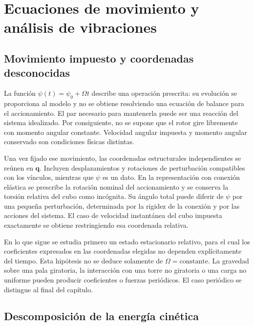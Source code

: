 \documentclass[11pt,a4paper,oneside]{report}
\newcommand{\vct}[1]{\bm{#1}}
\begin{document}
\chapter{Ecuaciones de movimiento y análisis de vibraciones}
\label{ch:operacion}
\section{Movimiento impuesto y coordenadas desconocidas}
La función $\psi(t)=\psi_0+\Omega t$ describe una operación prescrita: su evolución se proporciona al modelo y no se obtiene resolviendo una ecuación de balance para el accionamiento. El par necesario para mantenerla puede ser una reacción del sistema idealizado. Por consiguiente, no se supone que el rotor gire libremente con momento angular constante. Velocidad angular impuesta y momento angular conservado son condiciones físicas distintas.

Una vez fijado ese movimiento, las coordenadas estructurales independientes se reúnen en $\vct q$. Incluyen desplazamientos y rotaciones de perturbación compatibles con los vínculos, mientras que $\psi$ es un dato. En la representación con conexión elástica se prescribe la rotación nominal del accionamiento y se conserva la torsión relativa del cubo como incógnita. Su ángulo total puede diferir de $\psi$ por una pequeña perturbación, determinada por la rigidez de la conexión y por las acciones del sistema. El caso de velocidad instantánea del cubo impuesta exactamente se obtiene restringiendo esa coordenada relativa.

En lo que sigue se estudia primero un estado estacionario relativo, para el cual los coeficientes expresados en las coordenadas elegidas no dependen explícitamente del tiempo. Esta hipótesis no se deduce solamente de $\Omega=\mathrm{constante}$. La gravedad sobre una pala giratoria, la interacción con una torre no giratoria o una carga no uniforme pueden producir coeficientes o fuerzas periódicos. El caso periódico se distingue al final del capítulo.

\section{Descomposición de la energía cinética}
\end{document}
